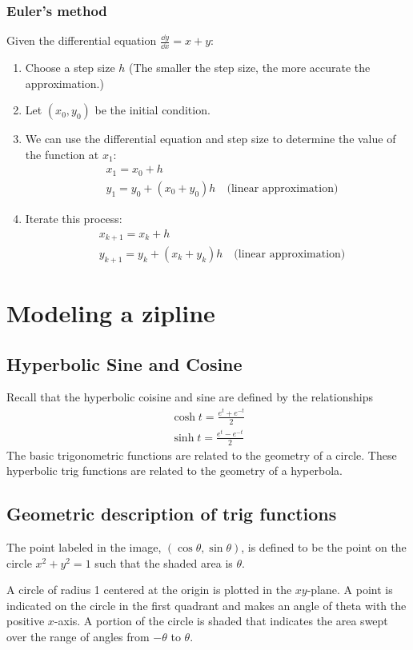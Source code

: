\subsubsection{Euler's method}
Given the differential equation $\frac{\dd y}{\dd x}=x+y$:
\begin{enumerate}
\item Choose a step size $h$ (The smaller the step size, the more accurate the approximation.)
\item Let $(x_0,y_0)$ be the initial condition.
\item We can use the differential equation and step size to determine the value of the function at $x_1$:
  \begin{align*}
  & x_1=x_0+h\\
  & y_1=y_0+(x_0+y_0)h\quad\text{(linear approximation)}
  \end{align*}
\item Iterate this process:
  \begin{align*}
  & x_{k+1}=x_k+h\\
  & y_{k+1}=y_k+(x_k+y_k)h\quad\text{(linear approximation)}
  \end{align*}
\end{enumerate}
\section{Modeling a zipline}
\subsection{Hyperbolic Sine and Cosine}
Recall that the hyperbolic coisine and sine are defined by the relationships
\begin{gather*}
\cosh t=\frac{e^t+e^{-t}}2\\
\sinh t=\frac{e^t-e^{-t}}2
\end{gather*}
The basic trigonometric functions are related to the geometry of a circle. These hyperbolic trig functions are related to the geometry of a hyperbola.
\subsection{Geometric description of trig functions}
The point labeled in the image, $(\cos\theta,\sin\theta)$, is defined to be the point on the circle $x^2+y^2=1$ such that the shaded area is $\theta$.

A circle of radius 1 centered at the origin is plotted in the $xy$-plane. A point is indicated on the circle in the first quadrant and makes an angle of theta with the positive $x$-axis. A portion of the circle is shaded that indicates the area swept over the range of angles from $-\theta$ to $\theta$.
